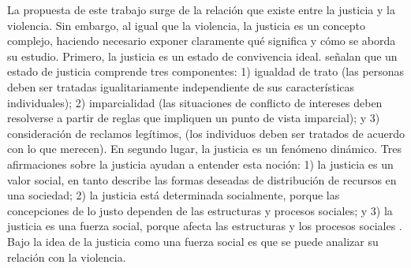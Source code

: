 \documentclass[12pt,twoside]{templates/facsothesis}
\begin{document}
La propuesta de este trabajo surge de la relación que existe entre la justicia y la violencia. Sin embargo, al igual que la violencia, la justicia es un concepto complejo, haciendo necesario exponer claramente qué significa y cómo se aborda su estudio. Primero, la justicia es un estado de convivencia ideal. \citet[p.38]{Liebig2016} señalan que un estado de justicia comprende tres componentes: 1) igualdad de trato (las personas deben ser tratadas igualitariamente independiente de sus características individuales); 2) imparcialidad (las situaciones de conflicto de intereses deben resolverse a partir de reglas que impliquen un punto de vista imparcial); y 3) consideración de reclamos legítimos, (los individuos deben ser tratados de acuerdo con lo que merecen). En segundo lugar, la justicia es un fenómeno dinámico. Tres afirmaciones sobre la justicia ayudan a entender esta noción: 1) la justicia es un valor social, en tanto describe las formas deseadas de distribución de recursos en una sociedad; 2) la justicia está determinada socialmente, porque las concepciones de lo justo dependen de las estructuras y procesos sociales; y 3) la justicia es una fuerza social, porque afecta las estructuras y los procesos sociales \citep[p.38]{Liebig2016}. Bajo la idea de la justicia como una fuerza social es que se puede analizar su relación con la violencia.
\end{document}
